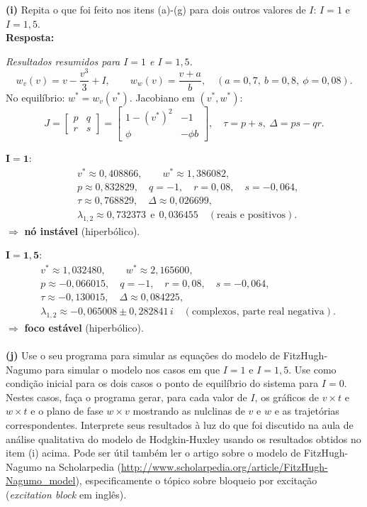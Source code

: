 \documentclass[english,11pt,a4paper]{article}
\begin{document}
	\noindent\textbf{(i)} Repita o que foi feito nos itens (a)-(g) para dois outros valores de $I$: $I = 1$ e $I = 1{,}5$.\\
	
	\noindent\textbf{Resposta:}
	
	\noindent\textit{Resultados resumidos para $I=1$ e $I=1{,}5$.}
	\[
	w_v(v)=v-\frac{v^3}{3}+I, 
	\qquad 
	w_w(v)=\frac{v+a}{b}, 
	\quad (a=0{,}7,\ b=0{,}8,\ \phi=0{,}08).
	\]
	No equilíbrio: \(w^{*}=w_v(v^{*})\). 
	Jacobiano em \((v^{*},w^{*})\): 
	\[
	J=\begin{bmatrix}p & q\\ r & s\end{bmatrix}
	=\begin{bmatrix}1-(v^{*})^2 & -1\\ \phi & -\phi b\end{bmatrix},\quad
	\tau=p+s,\ \Delta=ps-qr.
	\]
	
	\medskip
	\underline{\(\mathbf{I=1}\)}:
	\[
	\begin{aligned}
		&v^{*}\approx 0{,}408866,\qquad w^{*}\approx 1{,}386082,\\
		&p\approx 0{,}832829,\quad q=-1,\quad r=0{,}08,\quad s=-0{,}064,\\
		&\tau\approx 0{,}768829,\quad \Delta\approx 0{,}026699,\\
		&\lambda_{1,2}\approx 0{,}732373\ \ \text{e}\ \ 0{,}036455\quad(\text{reais e positivos}).
	\end{aligned}
	\]
	\(\Rightarrow\) \textbf{nó instável} (hiperbólico).
	
	\medskip
	\underline{\(\mathbf{I=1{,}5}\)}:
	\[
	\begin{aligned}
		&v^{*}\approx 1{,}032480,\qquad w^{*}\approx 2{,}165600,\\
		&p\approx -0{,}066015,\quad q=-1,\quad r=0{,}08,\quad s=-0{,}064,\\
		&\tau\approx -0{,}130015,\quad \Delta\approx 0{,}084225,\\
		&\lambda_{1,2}\approx -0{,}065008 \pm 0{,}282841\,i\quad(\text{complexos, parte real negativa}).
	\end{aligned}
	\]
	\(\Rightarrow\) \textbf{foco estável} (hiperbólico).\\\\
	
	
	\noindent\textbf{(j)} Use o seu programa para simular as equações do modelo de FitzHugh-Nagumo para simular o modelo nos casos em que $I = 1$ e $I = 1{,}5$. Use como condição inicial para os dois casos o ponto de equilíbrio do sistema para $I = 0$. Nestes casos, faça o programa gerar, para cada valor de $I$, os gráficos de $v \times t$ e $w \times t$ e o plano de fase $w \times v$ mostrando as nulclinas de $v$ e $w$ e as trajetórias correspondentes. Interprete seus resultados à luz do que foi discutido na aula de análise qualitativa do modelo de Hodgkin-Huxley usando os resultados obtidos no item (i) acima. Pode ser útil também ler o artigo sobre o modelo de FitzHugh-Nagumo na Scholarpedia (\url{http://www.scholarpedia.org/article/FitzHugh-Nagumo_model}), especificamente o tópico sobre bloqueio por excitação (\textit{excitation block} em inglês).\\
	
\end{document}

